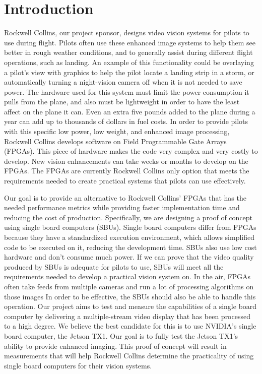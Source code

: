 \documentclass[letterpaper,10pt,titlepage]{IEEEtran}
\begin{document}
   \section{Introduction}
   Rockwell Collins, our project sponsor, designs video vision systems for pilots to use during flight. Pilots often use these enhanced image systems to help them see better in rough weather conditions, and to generally assist during different flight operations, such as landing. An example of this functionality could be overlaying a pilot's view with graphics to help the pilot locate a landing strip in a storm, or automatically turning a night-vision camera off when it is not needed to save power. The hardware used for this system must limit the power consumption it pulls from the plane, and also must be lightweight in order to have the least affect on the plane it can. Even an extra five pounds added to the plane during a year can add up to thousands of dollars in fuel costs. In order to provide pilots with this specific low power, low weight, and enhanced image processing, Rockwell Collins develops software on Field Programmable Gate Arrays (FPGAs). This piece of hardware makes the code very complex and very costly to develop. New vision enhancements can take weeks or months to develop on the FPGAs. The FPGAs are currently Rockwell Collins only option that meets the requirements needed to create practical systems that pilots can use effectively.\\ 
\par
   Our goal is to provide an alternative to Rockwell Collins' FPGAs that has the needed performance metrics while providing faster implementation time and reducing the cost of production. Specifically, we are designing a proof of concept using single board computers (SBUs). Single board computers differ from FPGAs because they have a standardized execution environment, which allows simplified code to be executed on it, reducing the development time. SBUs also use low cost hardware and don't consume much power. If we can prove that the video quality produced by SBUs is adequate for pilots to use, SBUs will meet all the requirements needed to develop a practical vision system on. In the air, FPGAs often take feeds from multiple cameras and run a lot of processing algorithms on those images In order to be effective, the SBUs should also be able to handle this operation. Our project aims to test and measure the capabilities of a single board computer by delivering a multiple-stream video display that has been processed to a high degree. We believe the best candidate for this is to use NVIDIA's single board computer, the Jetson TX1. Our goal is to fully test the Jetson TX1's ability to provide enhanced imaging. This proof of concept will result in measurements that will help Rockwell Collins determine the practicality of using single board computers for their vision systems.
   
\end{document}
